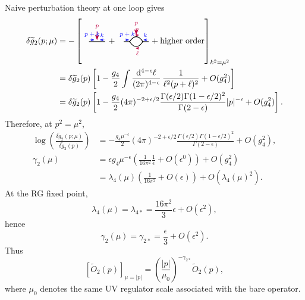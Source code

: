 Naive perturbation theory at one loop gives
\[
\begin{aligned}
  \delta\widetilde g_2(p;\mu)
  &=
  -\left[
  \begin{tikzpicture}[baseline=-0.45ex,>=Stealth,scale=0.62]
    \draw[thick] (-0.55,0) -- (0.55,0);
    \draw[purple,->,thick] (0,0.7) -- (0,0.1);
    \node[purple,above] at (0,0.7) {\scriptsize \(p\)};
    \draw[->,blue] (-0.5,0.12) -- (-0.18,0.12) node[midway,above] {\scriptsize \(p+k\)};
    \draw[->,blue] (0.5,0.12) -- (0.18,0.12) node[midway,above] {\scriptsize \(k\)};
  \end{tikzpicture}
  +
  \begin{tikzpicture}[baseline=-0.45ex,>=Stealth,scale=0.62]
    \draw[thick] (-0.85,0) -- (-0.45,0);
    \draw[thick] (0.45,0) -- (0.85,0);
    \fill (-0.45,0) circle (1.2pt);
    \fill (0.45,0) circle (1.2pt);
    \draw[thick] (-0.45,0) .. controls (-0.15,0.45) and (0.15,0.45) .. (0.45,0);
    \draw[thick] (-0.45,0) .. controls (-0.15,-0.45) and (0.15,-0.45) .. (0.45,0);
    \draw[purple,->,thick] (0,0.9) -- (0,0.47);
    \node[purple,above] at (0,0.9) {\scriptsize \(p\)};
    \draw[->,purple] (-0.05,0.45) -- (0.2,0.45) node[midway,above] {\scriptsize \(\ell\)};
    \draw[->,purple] (0.2,-0.45) -- (-0.05,-0.45) node[midway,below] {\scriptsize \(\ell\)};
    \draw[->,blue] (-0.75,0.12) -- (-0.48,0.12) node[midway,above] {\scriptsize \(p+k\)};
    \draw[->,blue] (0.75,0.12) -- (0.48,0.12) node[midway,above] {\scriptsize \(k\)};
  \end{tikzpicture}
  +\text{higher order}\right]_{k^2=\mu^2}
\\
  &=
  \delta\widetilde g_2(p)
  \left[
    1-\frac{g_4}{2}
    \int\frac{\dd^{4-\epsilon}\ell}{(2\pi)^{4-\epsilon}}\,
    \frac{1}{\ell^2(p+\ell)^2}
    +O(g_4^2)
  \right]
\\
  &=
  \delta\widetilde g_2(p)
  \left[
    1-\frac{g_4}{2}(4\pi)^{-2+\epsilon/2}
    \frac{\Gamma(\epsilon/2)\Gamma(1-\epsilon/2)^2}
         {\Gamma(2-\epsilon)}
    |p|^{-\epsilon}
    +O(g_4^2)
  \right].
\end{aligned}
\]
Therefore, at \(p^2=\mu^2\),
\[
\begin{aligned}
  \log\left(
    \frac{\delta\widetilde g_2(p;\mu)}
         {\delta\widetilde g_2(p)}
  \right)
  &=
  -\frac{g_4\mu^{-\epsilon}}{2}
  (4\pi)^{-2+\epsilon/2}
  \frac{\Gamma(\epsilon/2)\Gamma(1-\epsilon/2)^2}
       {\Gamma(2-\epsilon)}
  +O(g_4^2),
\\
  \gamma_2(\mu)
  &=
  \epsilon g_4\mu^{-\epsilon}
  \left(\frac{1}{16\pi^2}\frac{1}{\epsilon}+O(\epsilon^0)\right)
  +O(g_4^2)
\\
  &=
  \lambda_4(\mu)\left(\frac{1}{16\pi^2}+O(\epsilon)\right)
  +O(\lambda_4(\mu)^2).
\end{aligned}
\]
At the RG fixed point,
\[
  \lambda_4(\mu)=\lambda_{4*}
  =
  \frac{16\pi^2}{3}\epsilon+O(\epsilon^2),
\]
hence
\[
  \gamma_2(\mu)=\gamma_{2*}
  =
  \frac{\epsilon}{3}+O(\epsilon^2).
\]
Thus
\[
  [\widetilde O_2(p)]_{\mu=|p|}
  =
  \left(\frac{|p|}{\mu_0}\right)^{-\gamma_{2*}}
  \widetilde O_2(p),
  \tag{**}
\]
where \(\mu_0\) denotes the same UV regulator scale associated with the bare
operator.

